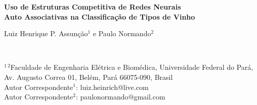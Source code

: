 



\begin{center}


\vspace*{2 cm}

\textsf{\bfseries 
\huge Uso de Estruturas Competitiva de Redes Neurais \\[3 mm]
Auto Associativas na Classificação
de Tipos de Vinho}



\vspace*{1.5 cm}

	\begin{large}
Luiz Henrique P. Assunção$^{1}$ e
Paulo Normando$^{2}$
	\end{large} \\[1.7 mm]



	\begin{small}
$^{1\ 2}$Faculdade de Engenharia Elétrica e Biomédica, Universidade Federal do Pará, \\[1 mm]
Av. Augusto Correa 01, Belém, Pará 66075-090, Brasil \\[7 mm]



Autor Correspondente$^{1}$: luiz.heinrich@live.com	\\[1 mm]
Autor Correspondente$^{2}$: paulonormando@gmail.com

	\end{small}

\end{center}
 


